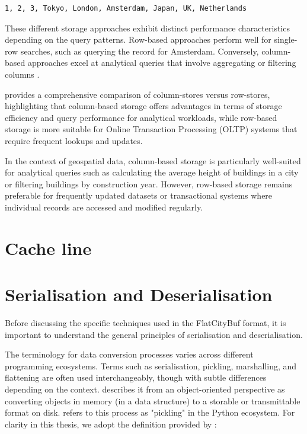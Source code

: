 \begin{verbatim}
1, 2, 3, Tokyo, London, Amsterdam, Japan, UK, Netherlands
\end{verbatim}

These different storage approaches exhibit distinct performance characteristics depending on the query patterns. Row-based approaches perform well for single-row searches, such as querying the record for Amsterdam. Conversely, column-based approaches excel at analytical queries that involve aggregating or filtering columns \citep{clickhouse_column}.

\citet{abadi_2008} provides a comprehensive comparison of column-stores versus row-stores, highlighting that column-based storage offers advantages in terms of storage efficiency and query performance for analytical workloads, while row-based storage is more suitable for Online Transaction Processing (OLTP) systems that require frequent lookups and updates.

In the context of geospatial data, column-based storage is particularly well-suited for analytical queries such as calculating the average height of buildings in a city or filtering buildings by construction year. However, row-based storage remains preferable for frequently updated datasets or transactional systems where individual records are accessed and modified regularly.

\section{Cache line}
\label{tb:cache_line}

\section{Serialisation and Deserialisation}
\label{tb:serialisation_deserialisation}
Before discussing the specific techniques used in the FlatCityBuf format, it is important to understand the general principles of serialisation and deserialisation.

The terminology for data conversion processes varies across different programming ecosystems. Terms such as serialisation, pickling, marshalling, and flattening are often used interchangeably, though with subtle differences depending on the context. \citet{cpp_serialization} describes it from an object-oriented perspective as converting objects in memory (in a data structure) to a storable or transmittable format on disk. \citet{py_serialization} refers to this process as "pickling" in the Python ecosystem. For clarity in this thesis, we adopt the definition provided by \citet{viotti_2022}:


